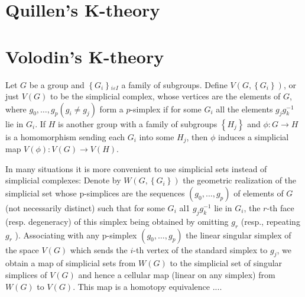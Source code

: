 \chapter{Quillen's K-theory}


\chapter{Volodin's K-theory}

Let $G$ be a group and $\left\{G_i\right\}{ }_{i \varepsilon I}$ a family of subgroups. Define $V\left(G,\left\{G_i\right\}\right)$, or just $V(G)$ to be the simplicial complex, whose vertices are the elements of $G$, where $g_0, \ldots, g_p\left(g_i \neq g_j\right)$ form a $p$-simplex if for some $G_i$ all the elements $g_j g_k^{-1}$ lie in $G_i$. If $H$ is another group with a family of subgroups $\left\{H_j\right\}$ and $\phi: G \rightarrow H$ is a homomorphism sending each $G_i$ into some $H_j$, then $\phi$ induces a simplicial map $V(\phi): V(G) \rightarrow V(H)$.

In many situations it is more convenient to use simplicial sets instead of simplicial complexes: Denote by $W\left(G,\left\{G_i\right\}\right)$ the geometric realization of the simplicial set whose p-simplices are the sequences $\left(g_0, \ldots, g_p\right)$ of elements of $G$ (not necessarily distinct) such that for some $G_i$ al1 $g_j g_k^{-1}$ lie in $G_i$, the $r$-th face (resp. degeneracy) of this simplex being obtained by omitting $g_r$ (resp., repeating $g_r$ ). Associating with any p-simplex $\left(g_0, \ldots, g_p\right)$ the linear singular simplex of the space $V(G)$ which sends the $i$-th vertex of the standard simplex to $g_j$, we obtain a map of simplicial sets from $W(G)$ to the simplicial set of singular simplices of $V(G)$ and hence a cellular map (linear on any simplex) from $W(G)$ to $V(G)$. This map is a homotopy equivalence .... %

